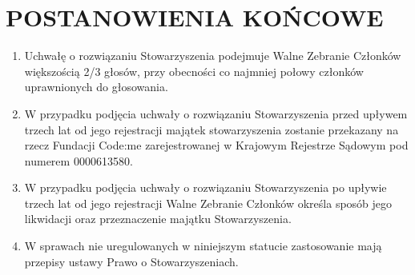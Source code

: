 \documentclass[a4paper,draft,10pt]{article}
\begin{document}
\section{POSTANOWIENIA KOŃCOWE}
  \begin{enumerate}
    \item Uchwałę o rozwiązaniu Stowarzyszenia podejmuje Walne Zebranie Członków większością 2/3 głosów, przy obecności co najmniej połowy członków uprawnionych do głosowania.
    \item W przypadku podjęcia uchwały o rozwiązaniu Stowarzyszenia przed upływem trzech lat od jego rejestracji majątek stowarzyszenia zostanie przekazany na rzecz Fundacji Code:me zarejestrowanej w Krajowym Rejestrze Sądowym pod numerem 0000613580.
    \item W przypadku podjęcia uchwały o rozwiązaniu Stowarzyszenia po upływie trzech lat od jego rejestracji Walne Zebranie Członków określa sposób jego likwidacji oraz przeznaczenie majątku Stowarzyszenia.
    \item W sprawach nie uregulowanych w niniejszym statucie zastosowanie mają przepisy ustawy Prawo o Stowarzyszeniach.
  \end{enumerate}
\end{document}

